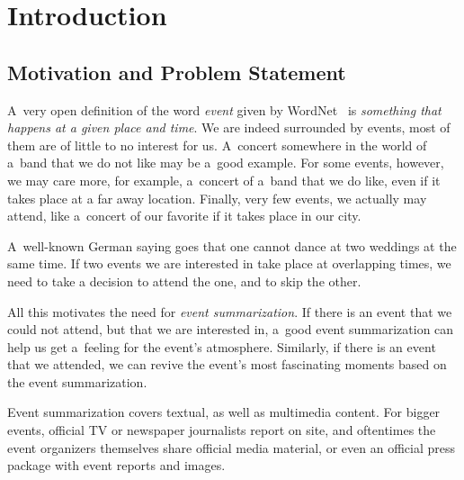

\chapter{Introduction}

\ifpdf
    \graphicspath{{1_introduction/figures/PNG/}{1_introduction/figures/PDF/}{1_introduction/figures/}}
\else
    \graphicspath{{1_introduction/figures/EPS/}{1_introduction/figures/}}
\fi


\section{Motivation and Problem Statement}
A~very open definition of the word \emph{event}
given by WordNet~\cite{Princeton:WordNet} is
\emph{something that happens at a given place and time}.
We are indeed surrounded by events, most of them are of little to no interest for us.
A~concert somewhere in the world of a~band that we do not like may be a~good example.
For some events, however, we may care more, for example,
a~concert of a~band that we do like, even if it takes place at a far away location.
Finally, very few events, we actually may attend,
like a~concert of our favorite if it takes place in our city.

A~well-known German saying goes that one cannot dance at two weddings at the same time.
If two events we are interested in take place at overlapping times,
we need to take a decision to attend the one, and to skip the other.

All this motivates the need for \emph{event summarization}.
If there is an event that we could not attend, but that we are interested in,
a~good event summarization can help us get a~feeling for the event's atmosphere.
Similarly, if there is an event that we attended,
we can revive the event's most fascinating moments based on the event summarization.

Event summarization covers textual, as well as multimedia content.
For bigger events, official TV or newspaper journalists report on site,
and oftentimes the event organizers themselves share official media material,
or even an official press package with event reports and images.

